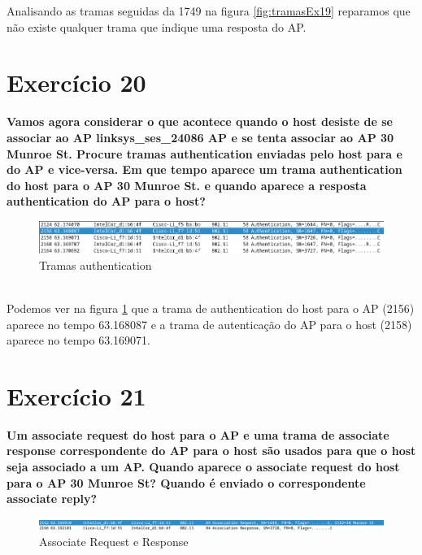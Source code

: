 \documentclass[a4paper]{report}
\begin{document}
Analisando as tramas seguidas da 1749 na figura \ref{fig:tramasEx19} reparamos 
que não existe qualquer trama que indique uma resposta do AP.

\section{Exercício 20}
\textbf{Vamos agora considerar o que acontece quando o host desiste de se
    associar ao AP linksys\_ses\_24086 AP e se tenta associar ao AP 30 Munroe
    St. Procure tramas authentication enviadas pelo host para e do AP e
    vice-versa. Em que tempo aparece um trama authentication do host para o AP
    30 Munroe St. e quando aparece a resposta authentication do AP para o
    host?}\\

\begin{figure}[H]
    \centering 
    \includegraphics[width=\textwidth]{images/respostaEx20.png}  
    \caption{Tramas authentication}
    \label{fig:respostaEx20}
\end{figure}\\

Podemos ver na figura \ref{fig:respostaEx20} que a trama de authentication do
host para o AP (2156) aparece no tempo 63.168087 e a trama de autenticação do 
AP para o host (2158) aparece no tempo 63.169071. 

\section{Exercício 21}
\textbf{Um associate request do host para o AP e uma trama de associate response
    correspondente do AP para o host são usados para que o host seja associado a
    um AP. Quando aparece o associate request do host para o AP 30 Munroe St?
    Quando é enviado o correspondente associate reply?}\\

\begin{figure}[H]
    \centering 
    \includegraphics[width=\textwidth]{images/associationEx21.png}  
    \caption{Associate Request e Response}
    \label{fig:associationEx21}
\end{figure}\\
\end{document}
